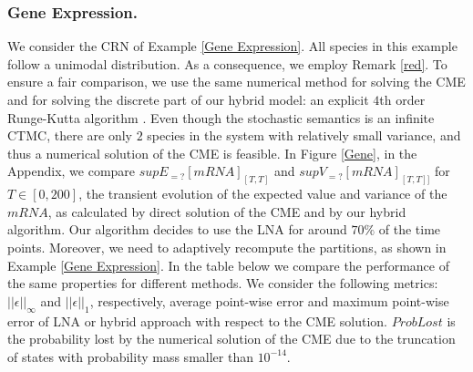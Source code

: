 \documentclass{llncs}
\begin{document}
\subsubsection{Gene Expression.}
We consider the CRN of Example \ref{Gene Expression}. All species in this example follow a unimodal distribution. As a consequence, we employ Remark \ref{red}. %
To ensure a fair comparison, we use the same numerical method for solving the CME and for solving the discrete part of our hybrid model: an explicit $4$th order Runge-Kutta algorithm \cite{henzinger2010hybrid}. 
Even though the stochastic semantics is an infinite CTMC, there are only $2$ species in the system with relatively small variance, and thus a numerical solution of the CME is feasible. 
In Figure \ref{Gene}, in the Appendix, we compare $supE_{=?}[mRNA]_{[T,T]}$ and $supV_{=?}[mRNA]_{[T,T]]}$ for $T \in [0,200]$, the transient evolution of the expected value and variance of the $mRNA$, as calculated by direct solution of the CME and by our hybrid algorithm. 
Our algorithm decides to use the LNA for around $70\%$ of the time points. Moreover, we need to adaptively recompute the partitions, as shown in Example \ref{Gene Expression}.
In the table below we compare the performance of the same properties for different methods. %
We consider the following metrics:
$ ||\epsilon||_{\infty}$ and
$ ||\epsilon||_{1}$, respectively, average point-wise error and maximum point-wise error of LNA or hybrid approach with respect to the CME solution. $ProbLost$ is the probability lost by the numerical solution of the CME due to the truncation of states with probability mass smaller than $10^{-14}$.
\end{document}
